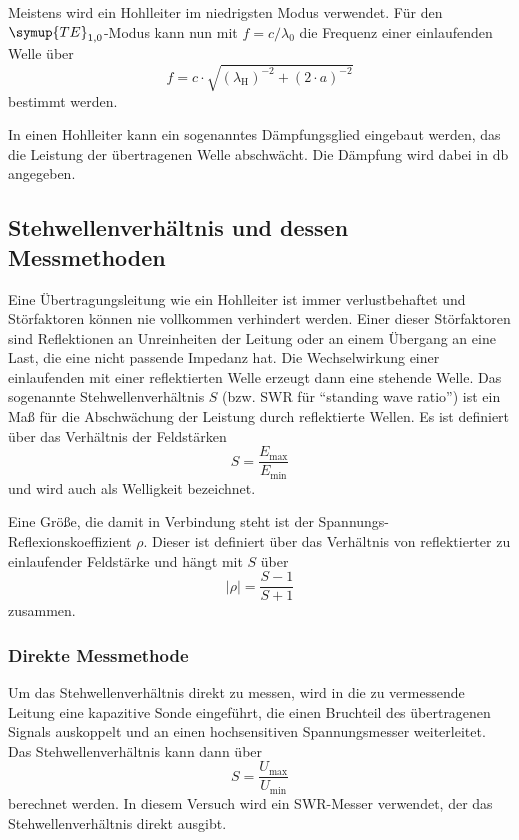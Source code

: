 Meistens wird ein Hohlleiter im niedrigsten Modus verwendet.
Für den $\symup{TE}_{1,0}$-Modus kann nun mit $f=c/\lambda_0$ die Frequenz einer einlaufenden Welle über
\begin{equation}
    f = c \cdot \sqrt{ \left( \lambda_\text{H} \right)^{-2} + \left( 2 \cdot a \right)^{-2} }
    \label{eq:frequenz}
\end{equation}
bestimmt werden.

In einen Hohlleiter kann ein sogenanntes Dämpfungsglied eingebaut werden, das die Leistung der übertragenen Welle abschwächt.
Die Dämpfung wird dabei in $\si{\decibel}$ angegeben.

\subsection{Stehwellenverhältnis und dessen Messmethoden}
\label{ssec:Stehwellenverhältnis}

Eine Übertragungsleitung wie ein Hohlleiter ist immer verlustbehaftet und Störfaktoren können nie vollkommen verhindert werden.
Einer dieser Störfaktoren sind Reflektionen an Unreinheiten der Leitung oder an einem Übergang an eine Last, die eine nicht passende Impedanz hat.
Die Wechselwirkung einer einlaufenden mit einer reflektierten Welle erzeugt dann eine stehende Welle.
Das sogenannte Stehwellenverhältnis $S$ (bzw. SWR für \enquote{standing wave ratio}) ist ein Maß für die Abschwächung der Leistung durch reflektierte Wellen.
Es ist definiert über das Verhältnis der Feldstärken
\begin{equation}
    S = \frac{E_\text{max}}{E_\text{min}}
\end{equation}
und wird auch als Welligkeit bezeichnet.

Eine Größe, die damit in Verbindung steht ist der Spannungs-Reflexionskoeffizient $\rho$.
Dieser ist definiert über das Verhältnis von reflektierter zu einlaufender Feldstärke 
und hängt mit $S$ über
\begin{equation}
    | \rho | = \frac{S-1}{S+1}
\end{equation}
zusammen.

\subsubsection{Direkte Messmethode}
\label{sssec:Direkte_Messmethode}

Um das Stehwellenverhältnis direkt zu messen, wird in die zu vermessende Leitung eine kapazitive Sonde eingeführt, 
die einen Bruchteil des übertragenen Signals auskoppelt und an einen hochsensitiven Spannungsmesser weiterleitet.
Das Stehwellenverhältnis kann dann über
\begin{equation}
    S = \frac{U_\text{max}}{U_\text{min}}
    \label{eq:Direkte_Methode}
\end{equation}
berechnet werden.
In diesem Versuch wird ein SWR-Messer verwendet, der das Stehwellenverhältnis direkt ausgibt.

